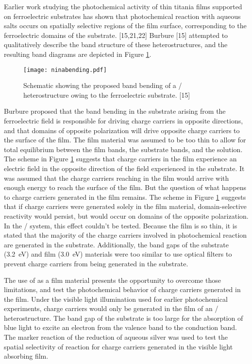 Earlier work studying the photochemical activity of thin titania films supported on ferroelectric substrates has shown that photochemical reaction with aqueous salts occurs on spatially selective regions of the film surface, corresponding to the ferroelectric domains of the substrate. [15,21,22] Burbure [15] attempted to qualitatively describe the band structure of these heterostructures, and the resulting band diagrams are depicted in Figure \ref{fig:ninabending}. 
\begin{figure}[htbp]
\begin{center}
\texttt{[image: ninabending.pdf]}
\caption[Proposed band bending of a / heterostructure]{Schematic showing the proposed band bending of a / heterostructure owing to the ferroelectric  substrate. [15]}
\label{fig:ninabending} %
\end{center}
\end{figure}
Burbure proposed that the band bending in the substrate arising from the ferroelectric field is responsible for driving charge carriers in opposite directions, and that domains of opposite polarization will drive opposite charge carriers to the surface of the film. The film material was assumed to be too thin to allow for total equilibrium between the film bands, the substrate bands, and the solution. The scheme in Figure \ref{fig:ninabending} suggests that charge carriers in the film experience an electric field in the opposite direction of the field experienced in the substrate. It was assumed that the charge carriers reaching in the film would arrive with enough energy to reach the surface of the film. But the question of what happens to charge carriers generated in the film remains. The scheme in Figure \ref{fig:ninabending} suggests that if charge carriers were generated solely in the film material, domain-selective reactivity would persist, but would occur on domains of the opposite polarization. In the / system, this effect couldn't be tested. Because the film is so thin, it is stated that the majority of the charge carriers involved in photochemical reaction are generated in the substrate. Additionally, the band gaps of the substrate (\texttildelow\SI{3.2}{\electronvolt}) and film (\texttildelow\SI{3.0}{\electronvolt}) materials were too similar to use optical filters to prevent charge carriers from being generated in the substrate. 

The use of  as a film material presents the opportunity to overcome those limitations, and test the photochemical behavior of charge carriers generated in the film. Under the visible light illumination used for earlier photochemical experiments, charge carriers would only be generated in the film of an / heterostructure. The band gap of the substrate is too large for the absorption of blue light to excite an electron from the valence band to the conduction band. The marker reaction of the reduction of aqueous silver was used to test the spatial selectivity of reaction for charge carriers generated in the visible light absorbing film.

